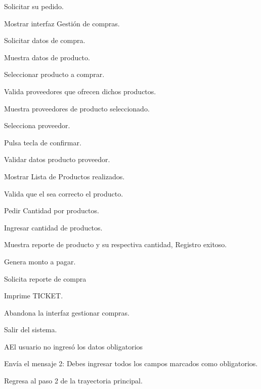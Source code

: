 \begin{UCtrayectoria}
	
	\UCpaso[\UCactor] Solicitar su pedido.
	
	\UCpaso[\UCsist] Mostrar interfaz Gestión de compras.
	
	\UCpaso[\UCactor] Solicitar datos de compra.

	\UCpaso[\UCsist] Muestra datos de  producto.

	\UCpaso[\UCactor] Seleccionar producto a comprar.
	
	\UCpaso[\UCsist] Valida proveedores que ofrecen dichos productos. 
	
	\UCpaso[\UCsist] Muestra proveedores de producto seleccionado. 

	\UCpaso[\UCactor] Selecciona proveedor.

	\UCpaso[\UCactor] Pulsa tecla de confirmar.
	
	\UCpaso[\UCsist] Validar datos producto proveedor. 
	
	\UCpaso[\UCsist] Mostrar Lista de Productos realizados. 

	\UCpaso[\UCsist] Valida que el sea correcto el producto. 

	\UCpaso[\UCsist] Pedir Cantidad por productos.

	\UCpaso[\UCactor] Ingresar cantidad de productos.

	\UCpaso[\UCsist] Muestra reporte de producto y su respectiva cantidad, Registro exitoso.

	\UCpaso[\UCsist] Genera monto a pagar.
	 
	\UCpaso[\UCactor] Solicita reporte de compra

	\UCpaso[\UCsist] Imprime TICKET.

	\UCpaso[\UCsist] Abandona la interfaz gestionar compras.

	\UCpaso[\UCactor] Salir del sistema.
	
\end{UCtrayectoria}


\begin{UCtrayectoriaA}{A}{El usuario no ingresó los datos obligatorios}
	
	\UCpaso[\UCsist] Envía el mensaje 2: Debes ingresar todos los campos marcados como obligatorios.
	
	\UCpaso[] Regresa al paso 2 de la trayectoria principal.
	
\end{UCtrayectoriaA}

